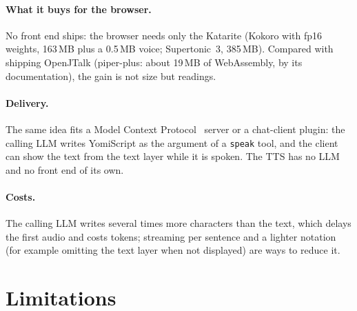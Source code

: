 \documentclass[11pt,a4paper]{article}
\begin{document}
\paragraph{What it buys for the browser.} No front end ships: the browser needs only the Katarite (Kokoro with fp16
weights, 163\,MB plus a 0.5\,MB voice; Supertonic~3, 385\,MB). Compared with shipping OpenJTalk (piper-plus: about
19\,MB of WebAssembly, by its documentation), the gain is not size but readings.

\paragraph{Delivery.} The same idea fits a Model Context Protocol~\citep{mcp} server or a chat-client plugin: the
calling LLM writes YomiScript as the argument of a \texttt{speak} tool, and the client can show the text from the text
layer while it is spoken. The TTS has no LLM and no front end of its own.

\paragraph{Costs.} The calling LLM writes several times more characters than the text, which delays the first audio and
costs tokens; streaming per sentence and a lighter notation (for example omitting the text layer when not displayed)
are ways to reduce it.

\section{Limitations}\label{sec:limits}
\end{document}
